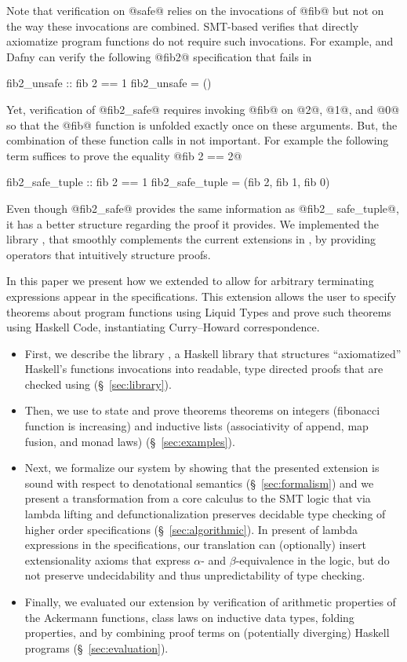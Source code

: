 Note that verification on @safe@ relies on the invocations of @fib@
but not on the way these invocations are combined.
%
SMT-based verifies that directly axiomatize program functions do not require such invocations.
For example, \fstar and Dafny can verify the following @fib2@ specification that fails in
\liquidHaskell
%
\begin{code}
  fib2_unsafe :: {fib 2 == 1}
  fib2_unsafe = ()
\end{code}
%
Yet, verification of @fib2_safe@ requires invoking @fib@ on @2@, @1@, and @0@
so that the @fib@ function is unfolded exactly once on these arguments.
%
But, the combination of these function calls in not important.
For example the following term suffices to prove the equality @fib 2 == 2@
\begin{code}
  fib2_safe_tuple :: {fib 2 == 1}
  fib2_safe_tuple = (fib 2, fib 1, fib 0)
\end{code}
%
Even though @fib2_safe@ provides the same information as
@fib2_ safe_tuple@,
it has a better structure regarding the proof it provides.
%
We implemented the library \libname, that smoothly complements the
current extensions in \liquidHaskell, by providing operators that
intuitively structure proofs.

In this paper we present how we extended \liquidHaskell
to allow for arbitrary terminating expressions appear in the specifications.
%
This extension allows the user to specify theorems about program functions
using Liquid Types and prove such theorems using Haskell Code,
instantiating Curry–Howard correspondence.
\begin{itemize}
\item First, we describe the library \libname,
a Haskell library that structures ``axiomatized'' Haskell's functions invocations
into readable, type directed proofs that are checked using \liquidHaskell
(\S~\ref{sec:library}).
%
\item Then, we use \libname to state and prove theorems theorems
on integers (\eg fibonacci function is increasing)
and inductive lists (\eg associativity of append, map fusion, and monad laws)
%
(\S~\ref{sec:examples}).
\item Next, we formalize our system by showing that
the presented extension is sound with respect to denotational semantics
%
(\S~\ref{sec:formalism})
and we present a transformation from a core calculus to
the SMT logic that via lambda lifting and defunctionalization
preserves decidable type checking
of higher order specifications (\S~\ref{sec:algorithmic}).
%
In present of lambda expressions in the specifications,
our translation can (optionally) insert extensionality axioms
that express $\alpha$- and $\beta$-equivalence in the logic,
but do not preserve undecidability and thus unpredictability of type checking.

\item Finally, we evaluated our extension by verification of
arithmetic properties of the Ackermann functions,
class laws on inductive data types,
folding properties,
and by combining proof terms on (potentially diverging)
Haskell programs (\S~\ref{sec:evaluation}).
\end{itemize}
